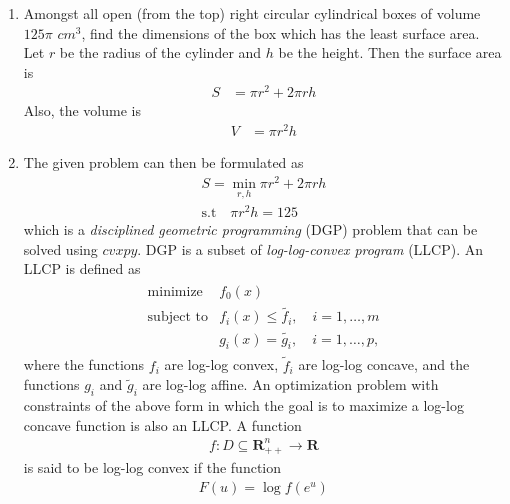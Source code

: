 \begin{enumerate}[label=\thesection.\arabic*.,ref=\thesection.\theenumi]

\item Amongst all open (from the top) right circular cylindrical boxes of volume $125 \pi $ $cm^3$, find the dimensions of the box which has the least surface area.\\  
\solution Let $r$ be the radius of the cylinder and $h$ be the height.  Then the surface area is 
		\begin{align}
			\label{eq:opt-box-S}
			S &= \pi r^2 + 2\pi r h 
		\end{align}
		Also, the volume is 
		\begin{align}
			\label{eq:opt-box-V}
			V &= \pi r^2 h 
		\end{align}
			\item 
		The given problem can then be formulated as 
		\begin{align}
			S = \min_{r,h}\pi r^2 + 2\pi r h 
			\\
			\text{s.t} \quad \pi r^2 h =125 
		\end{align}
				which is a {\em disciplined geometric programming} (DGP) problem that can be solved using $cvxpy$. DGP is a subset of 
				 {\em log-log-convex program} (LLCP). An LLCP is defined as
				\begin{equation}
\begin{split}
\begin{array}{ll}
\mbox{minimize} & f_0(x) \\
\mbox{subject to} & f_i(x) \leq \tilde{f_i}, \quad i=1, \ldots, m\\
& g_i(x) = \tilde{g_i}, \quad i=1, \ldots, p,
\end{array}
\end{split}
\end{equation}
where the functions $f_i$
				are log-log convex, $\tilde{f}_i$
 are log-log concave, and the functions $g_i$
				and $\tilde{g}_i$
 are log-log affine. An optimization problem with constraints of the above form in which the goal is to maximize a log-log concave function is also an LLCP.
A function 
				\begin{align}
 f : D \subseteq \mathbf{R}^{n}_{++} \to \mathbf{R}
				\end{align}
				is said to be log-log convex if the function
				\begin{align}
				F(u)=\log f(e^u)
				\end{align}

\end{enumerate}
